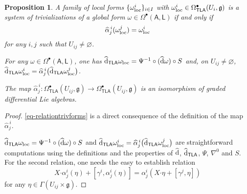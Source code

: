 \documentclass[number]{elsarticle}
\newtheorem{proposition}[theorem]{Proposition}
\theoremstyle{definition}
\theoremstyle{remark}
\numberwithin{equation}{section}
\begin{document}
\begin{proposition}
\label{prop-relationtrivformslocaldifferentialcommutes}
A family of local forms $\{\omega_{{\text{\textup{loc}}}}^i\}_{i \in I}$ with $\omega_{{\text{\textup{loc}}}}^i \in \Omega^{\bullet}_{{{{\mathbf{\mathsf{{TLA}}}}}}}(U_i,{{\mathfrak g}})$ is a system of trivializations of a global form $\omega \in \Omega^{\bullet}({{{{\mathbf{\mathsf{{A}}}}}}}, {{{{\mathbf{\mathsf{{L}}}}}}})$ if and only if 
\begin{equation}
\label{eq-relationtrivforms}
{\widehat{\alpha}}_{j}^{\,i}(\omega_{{\text{\textup{loc}}}}^j) = \omega_{{\text{\textup{loc}}}}^i
\end{equation}
for any $i,j$ such that $U_{ij} \neq {{\varnothing}}$.

For any $\omega \in \Omega^{\bullet}({{{{\mathbf{\mathsf{{A}}}}}}}, {{{{\mathbf{\mathsf{{L}}}}}}})$, one has ${\widehat{\text{\textup{d}}}}_{{{{\mathbf{\mathsf{{TLA}}}}}}} \omega_{{\text{\textup{loc}}}} = \Psi^{-1} \circ ({\widehat{\text{\textup{d}}}}\omega) \circ S$ and, on $U_{ij} \neq {{\varnothing}}$, ${\widehat{\text{\textup{d}}}}_{{{{\mathbf{\mathsf{{TLA}}}}}}} \omega_{{\text{\textup{loc}}}}^i = {\widehat{\alpha}}_{j}^{\,i} \big({\widehat{\text{\textup{d}}}}_{{{{\mathbf{\mathsf{{TLA}}}}}}} \omega_{{\text{\textup{loc}}}}^j \big)$.

The map ${\widehat{\alpha}}_{j}^{\,i} : \Omega^{\bullet}_{{{{\mathbf{\mathsf{{TLA}}}}}}}(U_{ij},{{\mathfrak g}}) \rightarrow \Omega^{\bullet}_{{{{\mathbf{\mathsf{{TLA}}}}}}}(U_{ij},{{\mathfrak g}})$ is an isomorphism of graded differential Lie algebras.
\end{proposition}

\begin{proof}
\eqref{eq-relationtrivforms} is a direct consequence of the definition of the map ${\widehat{\alpha}}_{j}^{\,i}$.

${\widehat{\text{\textup{d}}}}_{{{{\mathbf{\mathsf{{TLA}}}}}}} \omega_{{\text{\textup{loc}}}} = \Psi^{-1} \circ ({\widehat{\text{\textup{d}}}}\omega) \circ S$ and ${\widehat{\text{\textup{d}}}}_{{{{\mathbf{\mathsf{{TLA}}}}}}} \omega_{{\text{\textup{loc}}}}^i = {\widehat{\alpha}}_{j}^{\,i} \big({\widehat{\text{\textup{d}}}}_{{{{\mathbf{\mathsf{{TLA}}}}}}} \omega_{{\text{\textup{loc}}}}^j \big)$ are straightforward computations using the definitions and the properties of ${\widehat{\text{\textup{d}}}}$, ${\widehat{\text{\textup{d}}}}_{{{{\mathbf{\mathsf{{TLA}}}}}}}$, $\Psi$, $\nabla^0$ and $S$. For the second relation, one needs the easy to establish relation
\begin{equation*}
X {\mathord{\cdot}} \alpha^{i}_{j}(\eta) + [ \gamma^i, \alpha^{i}_{j}(\eta)] = \alpha^{i}_{j}(X {\mathord{\cdot}} \eta + [\gamma^j, \eta]) 
\end{equation*}
for any $\eta \in \Gamma(U_{ij} \times {{\mathfrak g}})$.
\end{proof}
\end{document}
